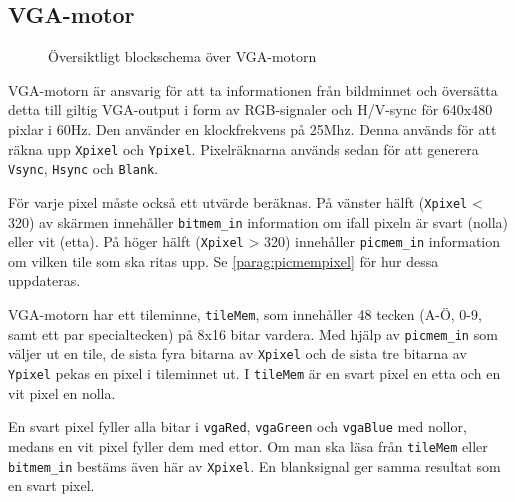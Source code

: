 \documentclass[]{article}
\begin{document}
\subsection{VGA-motor}
\begin{figure}[h!]
	\caption{Översiktligt blockschema över VGA-motorn}
\end{figure}

VGA-motorn är ansvarig för att ta informationen från bildminnet och översätta detta till giltig VGA-output i form av RGB-signaler och H/V-sync för 640x480 pixlar i 60Hz. Den använder en klockfrekvens på 25Mhz. Denna används för att räkna upp \texttt{Xpixel} och \texttt{Ypixel}. Pixelräknarna används sedan för att generera \texttt{Vsync}, \texttt{Hsync} och \texttt{Blank}.

För varje pixel måste också ett utvärde beräknas. På vänster hälft (\texttt{Xpixel} < 320) av skärmen innehåller \texttt{bitmem\_in} information om ifall pixeln är svart (nolla) eller vit (etta). På höger hälft (\texttt{Xpixel} > 320) innehåller \texttt{picmem\_in} information om vilken tile som ska ritas upp. Se \ref{parag:picmempixel} för hur dessa uppdateras.

VGA-motorn har ett tileminne, \texttt{tileMem}, som innehåller 48 tecken (A-Ö, 0-9, samt ett par specialtecken) på 8x16 bitar vardera. Med hjälp av \texttt{picmem\_in} som väljer ut en tile, de sista fyra bitarna av \texttt{Xpixel} och de sista tre bitarna av \texttt{Ypixel} pekas en pixel i tileminnet ut. I \texttt{tileMem} är en svart pixel en etta och en vit pixel en nolla. 

En svart pixel fyller alla bitar i \texttt{vgaRed}, \texttt{vgaGreen} och \texttt{vgaBlue} med nollor, medans en vit pixel fyller dem med ettor. Om man ska läsa från \texttt{tileMem} eller \texttt{bitmem\_in} bestäms även här av \texttt{Xpixel}. En blanksignal ger samma resultat som en svart pixel.

\newpage
\end{document}
